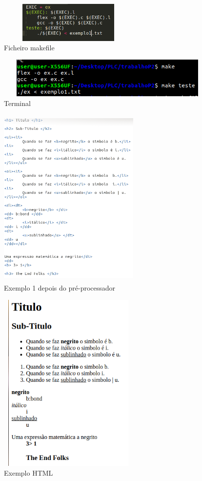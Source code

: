 \documentclass{report}
\begin{document}
\begin{figure}[h]
\centering
\includegraphics[width=7cm,height= 2cm]{makefile.png}
\caption{Ficheiro makefile}
\label{makefile}
\end{figure}

\begin{figure}[h]
\centering
\includegraphics[width=12cm,height= 2cm]{terminal.png}
\caption{Terminal}
\label{Terminal}
\end{figure}

\begin{figure}[h]
\centering
\includegraphics[width=7cm,height= 9cm]{exemplo1html.png}
\caption{Exemplo 1 depois do pré-processador}
\label{Ficheiro em HTML}
\end{figure}

\begin{figure}[h]
\centering
\includegraphics[width=7cm,height= 9cm]{HTML.png}
\caption{Exemplo HTML}
\label{HTML}
\end{figure}
\end{document}
